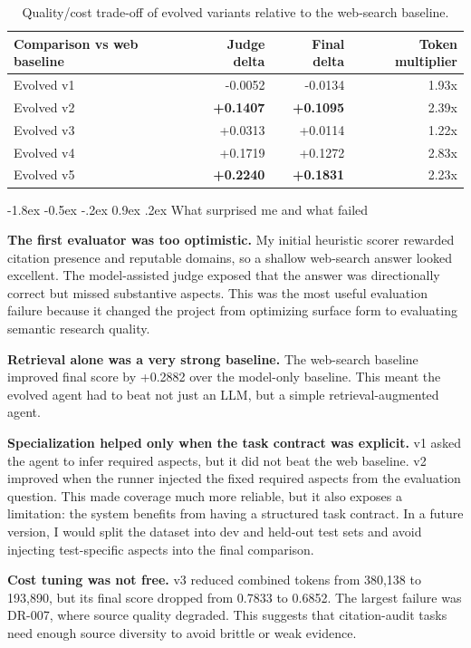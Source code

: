 \documentclass[10pt]{article}
\makeatletter
\renewcommand\section{\@startsection{section}{1}{\z@}%
  {-1.8ex \@plus -0.5ex \@minus -.2ex}%
  {0.9ex \@plus .2ex}%
  {\normalfont\large\bfseries}}
\makeatother
\begin{document}
\begin{table}[h]
\centering
\small
\begin{tabular}{lrrr}
\toprule
Comparison vs web baseline & Judge delta & Final delta & Token multiplier \\
\midrule
Evolved v1 & -0.0052 & -0.0134 & 1.93x \\
Evolved v2 & \textbf{+0.1407} & \textbf{+0.1095} & 2.39x \\
Evolved v3 & +0.0313 & +0.0114 & 1.22x \\
Evolved v4 & +0.1719 & +0.1272 & 2.83x \\
Evolved v5 & \textbf{+0.2240} & \textbf{+0.1831} & 2.23x \\
\bottomrule
\end{tabular}
\caption{Quality/cost trade-off of evolved variants relative to the web-search baseline.}
\label{tab:deltas}
\end{table}

\section{What surprised me and what failed}

\textbf{The first evaluator was too optimistic.} My initial heuristic scorer rewarded citation presence and reputable domains, so a shallow web-search answer looked excellent. The model-assisted judge exposed that the answer was directionally correct but missed substantive aspects. This was the most useful evaluation failure because it changed the project from optimizing surface form to evaluating semantic research quality.

\textbf{Retrieval alone was a very strong baseline.} The web-search baseline improved final score by +0.2882 over the model-only baseline. This meant the evolved agent had to beat not just an LLM, but a simple retrieval-augmented agent.

\textbf{Specialization helped only when the task contract was explicit.} v1 asked the agent to infer required aspects, but it did not beat the web baseline. v2 improved when the runner injected the fixed required aspects from the evaluation question. This made coverage much more reliable, but it also exposes a limitation: the system benefits from having a structured task contract. In a future version, I would split the dataset into dev and held-out test sets and avoid injecting test-specific aspects into the final comparison.

\textbf{Cost tuning was not free.} v3 reduced combined tokens from 380,138 to 193,890, but its final score dropped from 0.7833 to 0.6852. The largest failure was DR-007, where source quality degraded. This suggests that citation-audit tasks need enough source diversity to avoid brittle or weak evidence.
\end{document}
